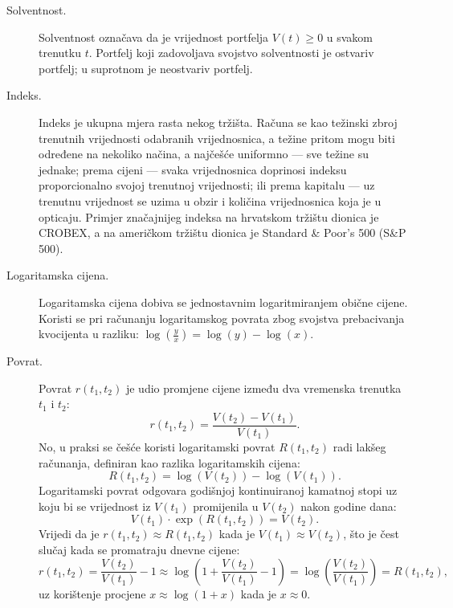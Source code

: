 \documentclass[lmodern, utf8, diplomski, numeric]{fer}
\newcommand{\q}{\left}
\newcommand{\w}{\right}
\begin{document}
\begin{description}
    \item[Solventnost.] Solventnost označava da je vrijednost portfelja $V{\q(t\w)} \ge 0$ u svakom trenutku $t$.
    Portfelj koji zadovoljava svojstvo solventnosti je ostvariv portfelj; u suprotnom je neostvariv portfelj.
    
    \item[Indeks.] Indeks je ukupna mjera rasta nekog tržišta.
    Računa se kao težinski zbroj trenutnih vrijednosti odabranih vrijednosnica, a težine pritom mogu biti određene na nekoliko načina, a najčešće uniformno --- sve težine su jednake; prema cijeni --- svaka vrijednosnica doprinosi indeksu proporcionalno svojoj trenutnoj vrijednosti; ili prema kapitalu --- uz trenutnu vrijednost se uzima u obzir i količina vrijednosnica koja je u opticaju.
    Primjer značajnijeg indeksa na hrvatskom tržištu dionica je CROBEX, a na američkom tržištu dionica je Standard \& Poor's 500 (S\&P 500).
    
    \item[Logaritamska cijena.] Logaritamska cijena dobiva se jednostavnim logaritmiranjem obične cijene.
      Koristi se pri računanju logaritamskog povrata zbog svojstva prebacivanja kvocijenta u razliku: $\log\q(\frac{y}{x}\w) = \log\q(y\w) - \log\q(x\w)$.
      
    \item[Povrat.]
      Povrat $r\q(t_1, t_2\w)$ je udio promjene cijene između dva vremenska trenutka $t_1$ i $t_2$:
      \begin{equation*}
        r\q(t_1, t_2\w) = \frac{V{\q(t_2\w)} - V{\q(t_1\w)}}{V{\q(t_1\w)}}.
      \end{equation*}
      No, u praksi se češće koristi logaritamski povrat $R\q(t_1, t_2\w)$ radi lakšeg računanja, definiran kao razlika logaritamskih cijena:
      \begin{equation*}
        R\q(t_1, t_2\w) = \log\q(V{\q(t_2\w)}\w) - \log\q(V{\q(t_1\w)}\w).
      \end{equation*}
      Logaritamski povrat odgovara godišnjoj kontinuiranoj kamatnoj stopi uz koju bi se vrijednost iz $V\q(t_1\w)$ promijenila u $V\q(t_2\w)$ nakon godine dana:
      \begin{equation*}
        V{\q(t_1\w)} \cdot \exp\q(R\q(t_1, t_2\w)\w) = V{\q(t_2\w)}.
      \end{equation*}
      Vrijedi da je $r\q(t_1, t_2\w) \approx R\q(t_1, t_2\w)$ kada je $V\q(t_1\w) \approx V\q(t_2\w)$, što je čest slučaj kada se promatraju dnevne cijene:
      \begin{equation*}
        r\q(t_1, t_2\w) = \frac{V\q(t_2\w)}{V\q(t_1\w)} - 1 \approx \log\q(1 + \frac{V\q(t_2\w)}{V\q(t_1\w)} - 1\w) = \log\q(\frac{V\q(t_2\w)}{V\q(t_1\w)}\w) = R\q(t_1, t_2\w),
      \end{equation*}
      uz korištenje procjene $x \approx \log\q(1 + x\w)$ kada je $x \approx 0$.
  \end{description}
  
\end{document}
